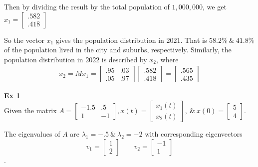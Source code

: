 \documentclass{article}
\begin{document}
  Then by dividing the result by the total population of $ 1,000,000 $, we get
  $x_1= \begin{bmatrix}
    .582\\
    .418
  \end{bmatrix} $ 
  
  So the vector $ x_1 $ gives the population distribution in $ 2021 $. That is $ 58.2\% ~\&~ 41.8\% $ of the population lived in the city and suburbs, respectively. Similarly, the population distribution in $ 2022 $ is described by $ x_2 $, where
  \[
    \begin{gathered}
    x_2=Mx_1=\begin{bmatrix}
      .95 &.03\\
      .05 &.97
    \end{bmatrix}
    \begin{bmatrix}
      .582\\
      .418
    \end{bmatrix}=
    \begin{bmatrix}
      .565\\
      .435
    \end{bmatrix}
    \end{gathered}
  \]

  \textbf{Ex 1}\\
  Given the matrix $ A=\begin{bmatrix}
    -1.5 &.5\\
    1 &-1
  \end{bmatrix}, x(t)=\begin{bmatrix}
    x_1(t)\\
    x_2(t)
  \end{bmatrix}, ~\&~ x(0)=\begin{bmatrix}
    5\\
    4
  \end{bmatrix} $. 

  The eigenvalues of $ A $ are $ \lambda_1=-.5 ~\&~ \lambda_2=-2 $ with corresponding eigenvectors
  \[
    v_1=\begin{bmatrix}
      1\\
      2
    \end{bmatrix} \qquad
    v_2=\begin{bmatrix}
      -1\\
      1
    \end{bmatrix}
  \].


  
  
\end{document}
